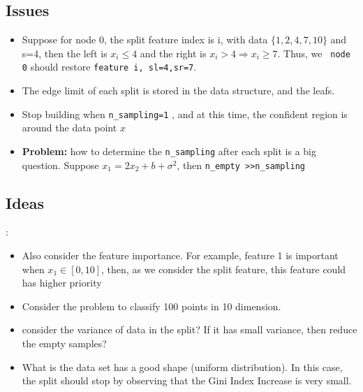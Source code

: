 \documentclass[11pt,onecolumn]{IEEEtran}
\begin{document}
\subsection{Issues}
\begin{itemize}
	\item Suppose for node 0, the split feature index is i, with data $\{1,2,4,7,10\}$ and s=4, then the left is $x_i\leq 4$ and the right is $x_i>4\Rightarrow x_i\geq 7$. Thus, we \texttt{ node 0} should restore  \texttt{feature i, sl=4,sr=7}.
	\item The edge limit of each split is stored in the data structure, and the leafs.
    \item Stop  building when  \texttt{n\_sampling=1} , and at this time, the confident region is around the data point $x$
    \item \textbf{Problem:} how to determine the \texttt{n\_sampling}  after each split is a big question.  Suppose $x_1=2 x_2+b+\sigma^2$, then \texttt{n\_empty >>n\_sampling} 
\end{itemize}



\subsection{Ideas}:
\begin{itemize}
	\item  Also consider the feature importance. For example, feature 1 is important when $x_1\in[0,10]$, then, as we consider the split feature, this feature could has higher priority
	\item Consider the problem to classify 100 points in 10 dimension.
    \item consider the variance of data in the split?  If it has small variance, then reduce the empty samples?
    \item What is the data set has a good shape (uniform distribution). In this case, the split should stop by observing that the Gini Index Increase is very small.
\end{itemize}





\end{document}
